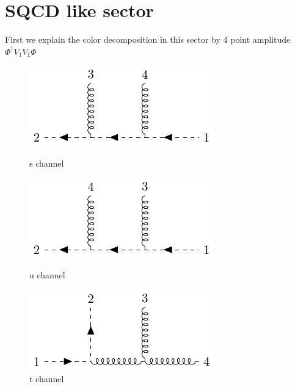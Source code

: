 \documentclass[12pt]{article}
\begin{document}
\section{SQCD like sector}
First we explain the color decomposition in this sector by 4 point amplitude $\Phi^\dagger V_1V_1\Phi$
    \begin{figure}[htbp]
        \centering
        \begin{minipage}[t]{0.32\textwidth}
            \centering
            \includegraphics[width=\linewidth]{sch.pdf}
            \caption*{s channel}
        \end{minipage}
        \hfill
        \begin{minipage}[t]{0.32\textwidth}
            \centering
            \includegraphics[width=\linewidth]{uch.pdf}
            \caption*{u channel}
        \end{minipage}
        \hfill
        \begin{minipage}[t]{0.32\textwidth}
            \centering
            \includegraphics[width=\linewidth]{tch.pdf}
            \caption*{t channel}
        \end{minipage}
    \end{figure}
\end{document}
